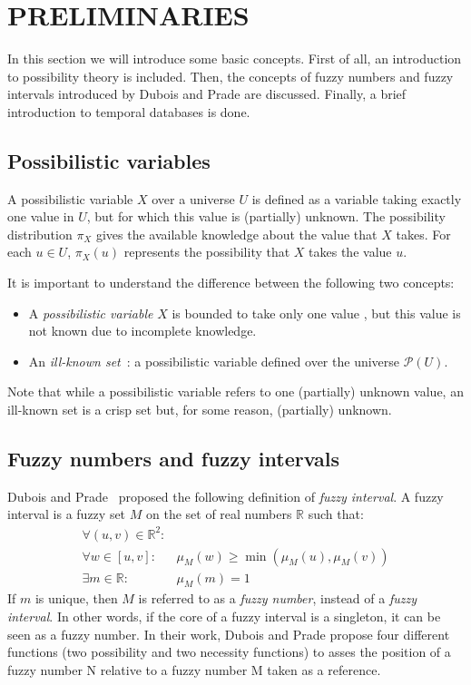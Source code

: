 \documentclass[twoside,twocolumn,a4paper]{article}
\newcommand{\Pow}{\mathcal{P}}
\begin{document}
\section{\label{sec:preliminaries}PRELIMINARIES}
In this section we will introduce some basic concepts. First of all, an introduction to possibility theory is included. Then, the concepts of fuzzy numbers and fuzzy intervals introduced by Dubois and Prade \cite{Dubois1983} are discussed. Finally, a brief introduction to temporal databases is done.

\subsection{\label{subsec:possibilistic-variables}Possibilistic variables}
A possibilistic variable $X$ over a universe $U$ is defined as a variable taking exactly one value in $U$, but for which this value is (partially) unknown. The possibility distribution $\pi_X$ gives the available knowledge about the value that $X$ takes. For each $u\in U$, $\pi_X(u)$ represents the possibility that $X$ takes the value $u$.

It is important to understand the difference between the following two concepts:
\begin{itemize}
\item
A \emph{possibilistic variable} $X$ is bounded to take only one value , but this value is not known due to incomplete knowledge. 
\item
An \emph{ill-known set}~\cite{Dubois88b}: a possibilistic variable defined over the universe $\Pow(U)$.
\end{itemize}

Note that while a possibilistic variable refers to one (partially) unknown value, an ill-known set is a crisp set but, for some reason, (partially) unknown.


\subsection{\label{subsec:fuzzy-numbers}Fuzzy numbers and fuzzy intervals}
Dubois and Prade~\cite{Dubois1983} proposed the following definition of \emph{fuzzy interval}.
A fuzzy interval is a fuzzy set $M$ on the set of real numbers $\mathbb{R}$ such that:
\begin{eqnarray}
\forall (u,v)\in\mathbb{R}^2:&\\
\nonumber
\forall w \in [u,v]:&\mu_M(w) \geq\min(\mu_M(u),\mu_M(v))  \\
\exists m \in \mathbb{R}:& \mu_M(m)=1 
\end{eqnarray}
If $m$ is unique, then $M$ is referred to as a \emph{fuzzy number}, instead of a \emph{fuzzy interval}. In other words, if the core of a fuzzy interval is a singleton, it can be seen as a fuzzy number. In their work, Dubois and Prade propose four different functions (two possibility and two necessity functions) to asses the position of a fuzzy number N relative to  a fuzzy number M taken as a reference.
\end{document}
